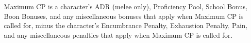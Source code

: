 \documentclass[oneside,11pt,english]{book}
\begin{document}
Maximum CP is a character's ADR (melee only), Proficiency Pool, School Bonus, Boon Bonuses, and
any miscellaneous bonuses that apply when Maximum CP is called for, minus the character's
Encumbrance Penalty, Exhaustion Penalty, Pain, and any miscellaneous penalties that apply when
Maximum CP is called for.
%
%
%
%
%
\end{document}
